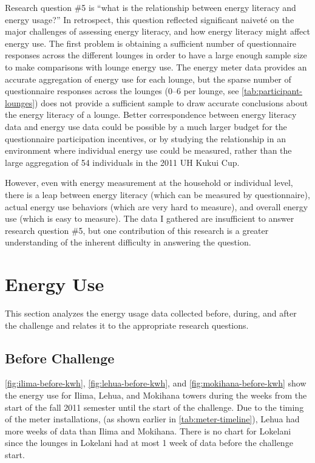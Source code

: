 Research question \#5 is ``what is the relationship between energy literacy and energy usage?'' In retrospect, this question reflected significant naivet\'e on the major challenges of assessing energy literacy, and how energy literacy might affect energy use. The first problem is obtaining a sufficient number of questionnaire responses across the different lounges in order to have a large enough sample size to make comparisons with lounge energy use. The energy meter data provides an accurate aggregation of energy use for each lounge, but the sparse number of questionnaire responses across the lounges (0--6 per lounge, see \autoref{tab:participant-lounges}) does not provide a sufficient sample to draw accurate conclusions about the energy literacy of a lounge. Better correspondence between energy literacy data and energy use data could be possible by a much larger budget for the questionnaire participation incentives, or by studying the relationship in an environment where individual energy use could be measured, rather than the large aggregation of 54 individuals in the 2011 UH Kukui Cup.

However, even with energy measurement at the household or individual level, there is a leap between energy literacy (which can be measured by questionnaire), actual energy use behaviors (which are very hard to measure), and overall energy use (which is easy to measure). The data I gathered are insufficient to answer research question \#5, but one contribution of this research is a greater understanding of the inherent difficulty in answering the question.


\section{Energy Use}
\label{sec:energy-use}

This section analyzes the energy usage data collected before, during, and after the challenge and relates it to the appropriate research questions.


\subsection{Before Challenge}

\autoref{fig:ilima-before-kwh}, \autoref{fig:lehua-before-kwh}, and \autoref{fig:mokihana-before-kwh} show the energy use for Ilima, Lehua, and Mokihana towers during the weeks from the start of the fall 2011 semester until the start of the challenge. Due to the timing of the meter installations, (as shown earlier in \autoref{tab:meter-timeline}), Lehua had more weeks of data than Ilima and Mokihana. There is no chart for Lokelani since the lounges in Lokelani had at most 1 week of data before the challenge start.

